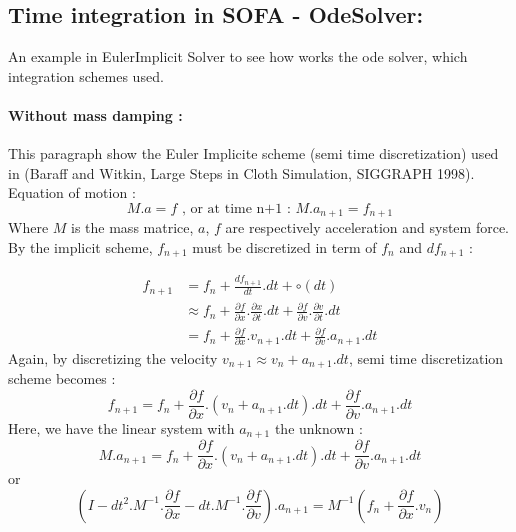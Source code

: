 \documentclass[a4paper,10pt]{article}
\begin{document}
\subsection{Time integration in SOFA - OdeSolver: }
An example in EulerImplicit Solver to see how works the ode solver, which integration schemes used. 
\paragraph{Without mass damping :} This paragraph show the Euler Implicite scheme (semi time discretization) used in (Baraff and Witkin, Large Steps in Cloth Simulation, SIGGRAPH 1998). Equation of motion :
 \[
M.a=f \text{    ,  or at time n+1 :   }M.a_{n+1}=f_{n+1}
\]
Where $M$ is the mass matrice, $a$, $f$ are respectively acceleration and system force. By the implicit scheme, $f_{n+1}$ must be discretized in term of $f_{n}$ and $df_{n+1}$ :


\[
\begin{array}{rl}
f_{n+1} &       = f_n + \frac{ df_{n+1} }{dt}.dt + \circ(dt) \\
        & \approx f_n + \frac{\partial f}{\partial x}.\frac{\partial x}{\partial t}.dt + \frac{\partial f}{\partial v}.\frac{\partial v}{\partial t}.dt  \\
        &       = f_n + \frac{\partial f}{\partial x}.v_{n+1}.dt + \frac{\partial f}{\partial v}.a_{n+1}.dt  
\end{array}
\]
Again, by discretizing the velocity $v_{n+1} \approx v_{n}+a_{n+1}.dt$, semi time discretization scheme becomes :
\[
f_{n+1} = f_n + \frac{\partial f}{\partial x}.(v_{n}+a_{n+1}.dt).dt + \frac{\partial f}{\partial v}.a_{n+1}.dt  
\]
Here, we have the linear system with $a_{n+1}$ the unknown : 
\[
M.a_{n+1} = f_n + \frac{\partial f}{\partial x}.(v_{n}+a_{n+1}.dt).dt + \frac{\partial f}{\partial v}.a_{n+1}.dt  
\]
or
\[
(I - dt^2.M^{-1}.\frac{\partial f}{\partial x} - dt.M^{-1}.\frac{\partial f}{\partial v}).a_{n+1}= M^{-1}(f_n + \frac{\partial f}{\partial x}.v_n)
\]
\end{document}
